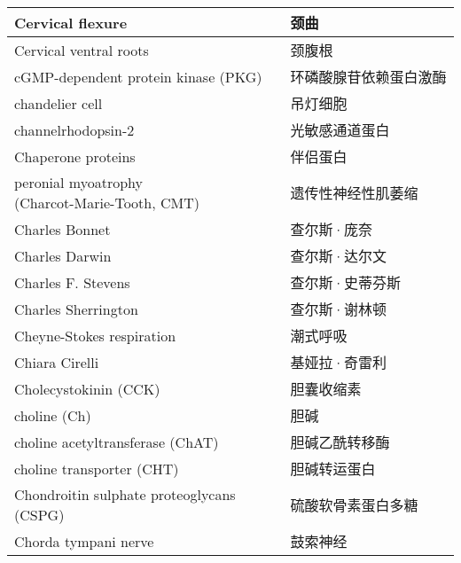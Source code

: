 \begin{longtable}{lll}
	\midrule
	Cervical flexure   && 颈曲  \\
	
	\midrule
	Cervical ventral roots   && 颈腹根  \\
	
	\midrule
	cGMP-dependent protein kinase (PKG)   && 环磷酸腺苷依赖蛋白激酶  \\
	
	\midrule
	chandelier cell   && 吊灯细胞  \\
	
	\midrule
	channelrhodopsin-2   && 光敏感通道蛋白  \\
	
	\midrule
	Chaperone proteins   && 伴侣蛋白  \\
	
	\midrule
	\makecell[l]{peronial myoatrophy \\ (Charcot-Marie-Tooth, CMT)}   && 遗传性神经性肌萎缩  \\
	
	\midrule
	Charles Bonnet   && 查尔斯·庞奈  \\
	
	\midrule
	Charles Darwin   && 查尔斯·达尔文  \\
	
	\midrule
	Charles F. Stevens   && 查尔斯·史蒂芬斯  \\
	
	\midrule
	Charles Sherrington   && 查尔斯·谢林顿  \\
	
	\midrule
	Cheyne-Stokes respiration   && 潮式呼吸  \\
	
	\midrule
	Chiara Cirelli   && 基娅拉·奇雷利  \\
	
	\midrule
	Cholecystokinin (CCK)   && 胆囊收缩素  \\
	
	\midrule
	choline (Ch)   && 胆碱  \\
	
	\midrule
	choline acetyltransferase (ChAT)   && 胆碱乙酰转移酶  \\
	
	\midrule
	choline transporter (CHT)   && 胆碱转运蛋白  \\
	
	\midrule
	\makecell[l]{Chondroitin sulphate proteoglycans \\(CSPG)} && 硫酸软骨素蛋白多糖  \\
	
	\midrule
	Chorda tympani nerve   && 鼓索神经  \\
	

\end{longtable}

